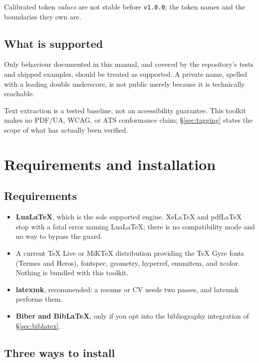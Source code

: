 \documentclass[11pt]{article}
\begin{document}
Calibrated token \emph{values} are not stable before \texttt{v1.0.0}; the token
names and the boundaries they own are.

\subsection{What is supported}

Only behaviour documented in this manual, and covered by the repository's tests
and shipped examples, should be treated as supported. A private name, spelled
with a leading double underscore, is not public merely because it is
technically reachable.

Text extraction is a tested baseline, not an accessibility guarantee. This
toolkit makes no PDF/UA, WCAG, or ATS conformance claim; \S\ref{sec:tagging}
states the scope of what has actually been verified.

\section{Requirements and installation}
\label{sec:install}

\subsection{Requirements}

\begin{itemize}
  \item \textbf{LuaLaTeX}, which is the sole supported engine. XeLaTeX and
        pdf\LaTeX{} stop with a fatal error naming LuaLaTeX; there is no
        compatibility mode and no way to bypass the guard.
  \item A current \TeX{} Live or MiK\TeX{} distribution providing the
        \textsf{TeX Gyre} fonts (Termes and Heros), \textsf{fontspec},
        \textsf{geometry}, \textsf{hyperref}, \textsf{enumitem}, and
        \textsf{xcolor}. Nothing is bundled with this toolkit.
  \item \textbf{latexmk}, recommended: a resume or CV needs two passes, and
        latexmk performs them.
  \item \textbf{Biber and BibLaTeX}, only if you opt into the bibliography
        integration of \S\ref{sec:biblatex}.
\end{itemize}

\subsection{Three ways to install}
\end{document}
